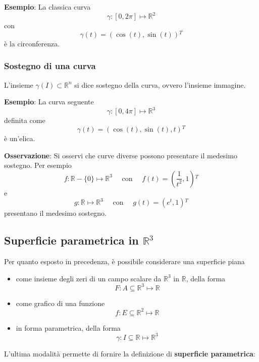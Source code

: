 \documentclass[a4paper]{extarticle}
\begin{document}
\vspace{2em}
\noindent
\textbf{Esempio}: La classica curva
\[\gamma : [0,2\pi] \longmapsto \mathbb{R}^2\]
con
\[\gamma(t) = \left(\cos(t),\sin(t)\right){^T}\]
è la circonferenza.

\vspace{1em}
\noindent
\subsubsection{Sostegno di una curva}
L'insieme $\gamma(I) \subset \mathbb{R}^n$ si dice sostegno della curva, ovvero l'insieme immagine.

\vspace{1em}
\noindent
\textbf{Esempio}: La curva seguente
\[\gamma : [0,4\pi] \longmapsto \mathbb{R}^3\]
definita come
\[\gamma(t) = \left(\cos(t),\sin(t),t\right){^T}\]
è un'elica.

\vspace{1em}
\noindent
\textbf{Osservazione}: Si osservi che curve diverse possono presentare il medesimo sostegno. Per esempio
\[f : \mathbb{R} - \{0\} \longmapsto \mathbb{R}^3 \hspace{1em} \text{ con } \hspace{1em} f(t)=\left(\frac{1}{t^2},1\right){^T}\]
e
\[g : \mathbb{R} \longmapsto \mathbb{R}^3 \hspace{1em} \text{ con } \hspace{1em} g(t)=\left(e^t,1\right){^T}\]
presentano il medesimo sostegno.

\vspace{1em}
\noindent
\subsection{Superficie parametrica in $\mathbb{R}^3$}
Per quanto esposto in precedenza, è possibile considerare una superficie piana
\begin{itemize}
    \item come insieme degli zeri di un campo scalare da $\mathbb{R}^3$ in $\mathbb{R}$, della forma
    \[F : A \subseteq \mathbb{R}^3 \longmapsto \mathbb{R}\]
    \item come grafico di una funzione
    \[f : E \subseteq \mathbb{R}^2 \longmapsto \mathbb{R}\]
    \item in forma parametrica, della forma
    \[\gamma : I \subseteq \mathbb{R} \longmapsto \mathbb{R}^3\]
\end{itemize}
L'ultima modalità permette di fornire la definizione di \textbf{superficie parametrica}:
\end{document}

